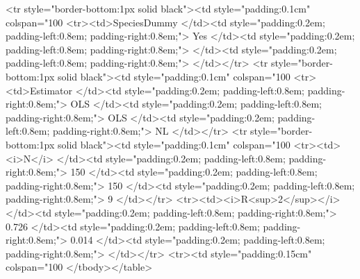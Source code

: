<tr style="border-bottom:1px solid black"><td style="padding:0.1cm" colspan="100%
<tr><td>SpeciesDummy         </td><td style="padding:0.2em; padding-left:0.8em; padding-right:0.8em;">      Yes </td><td style="padding:0.2em; padding-left:0.8em; padding-right:0.8em;">                  </td><td style="padding:0.2em; padding-left:0.8em; padding-right:0.8em;">                                                                                                </td></tr>
<tr style="border-bottom:1px solid black"><td style="padding:0.1cm" colspan="100%
<tr><td>Estimator            </td><td style="padding:0.2em; padding-left:0.8em; padding-right:0.8em;">      OLS </td><td style="padding:0.2em; padding-left:0.8em; padding-right:0.8em;">              OLS </td><td style="padding:0.2em; padding-left:0.8em; padding-right:0.8em;">                                                                                             NL </td></tr>
<tr style="border-bottom:1px solid black"><td style="padding:0.1cm" colspan="100%
<tr><td><i>N</i>             </td><td style="padding:0.2em; padding-left:0.8em; padding-right:0.8em;">      150 </td><td style="padding:0.2em; padding-left:0.8em; padding-right:0.8em;">              150 </td><td style="padding:0.2em; padding-left:0.8em; padding-right:0.8em;">                                                                                              9 </td></tr>
<tr><td><i>R<sup>2</sup></i> </td><td style="padding:0.2em; padding-left:0.8em; padding-right:0.8em;">    0.726 </td><td style="padding:0.2em; padding-left:0.8em; padding-right:0.8em;">            0.014 </td><td style="padding:0.2em; padding-left:0.8em; padding-right:0.8em;">                                                                                                </td></tr>
<tr><td style="padding:0.15cm" colspan="100%
</tbody></table>
